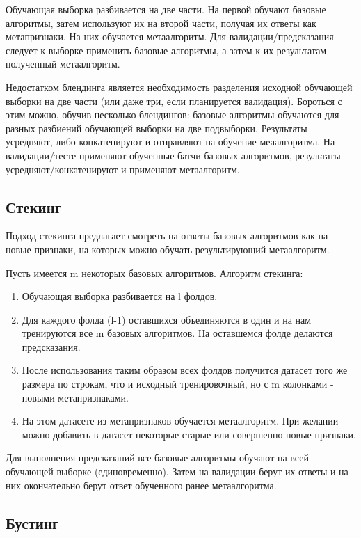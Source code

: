 Обучающая выборка разбивается на две части. На первой обучают базовые алгоритмы, затем используют их на второй части, получая их ответы как метапризнаки. На них обучается метаалгоритм. Для валидации/предсказания следует к выборке применить базовые алгоритмы, а затем к их результатам полученный метаалгоритм.

Недостатком блендинга является необходимость разделения исходной обучающей выборки на две части (или даже три, если планируется валидация). Бороться с этим можно, обучив несколько блендингов: базовые алгоритмы обучаются для разных разбиений обучающей выборки на две подвыборки. Результаты усредняют, либо конкатенируют и отправляют на обучение меаалгоритма. На валидации/тесте применяют обученные батчи базовых алгоритмов, результаты усредняют/конкатенируют и применяют метаалгоритм.

\subsection{Стекинг}

Подход стекинга предлагает смотреть на ответы базовых алгоритмов как на новые признаки, на которых можно обучать результирующий метаалгоритм.

Пусть имеется m некоторых базовых алгоритмов. Алгоритм стекинга:
\begin{enumerate}
    \item Обучающая выборка разбивается на l фолдов.
    \item Для каждого фолда (l-1) оставшихся объединяются в один и на нам тренируются все m базовых алгоритмов. На оставшемся фолде делаются предсказания.
    \item После использования таким образом всех фолдов получится датасет того же размера по строкам, что и исходный тренировочный, но с m колонками - новыми метапризнаками.
    \item На этом датасете из метапризнаков обучается метаалгоритм. При желании можно добавить в датасет некоторые старые или совершенно новые признаки.
\end{enumerate}

Для выполнения предсказаний все базовые алгоритмы обучают на всей обучающей выборке (единовременно). Затем на валидации берут их ответы и на них окончательно берут ответ обученного ранее метаалгоритма.  


\subsection{Бустинг}

